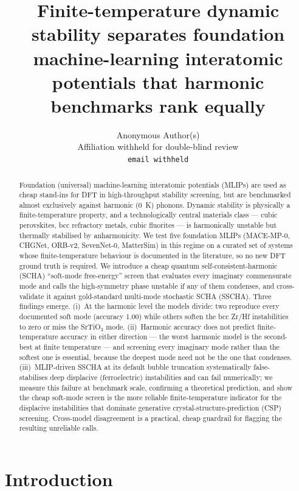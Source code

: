 \documentclass{article}
\title{Finite-temperature dynamic stability separates foundation machine-learning interatomic potentials that harmonic benchmarks rank equally}
\author{%
  Anonymous Author(s) \\
  Affiliation withheld for double-blind review \\
  \texttt{email withheld}
}
\begin{document}
\maketitle

\begin{abstract}
Foundation (universal) machine-learning interatomic potentials (MLIPs) are used as cheap stand-ins for DFT in high-throughput stability screening, but are benchmarked almost exclusively against harmonic (0~K) phonons. Dynamic stability is physically a finite-temperature property, and a technologically central materials class --- cubic perovskites, bcc refractory metals, cubic fluorites --- is harmonically unstable but thermally stabilised by anharmonicity. We test five foundation MLIPs (MACE-MP-0, CHGNet, ORB-v2, SevenNet-0, MatterSim) in this regime on a curated set of systems whose finite-temperature behaviour is documented in the literature, so no new DFT ground truth is required. We introduce a cheap quantum self-consistent-harmonic (SCHA) ``soft-mode free-energy'' screen that evaluates every imaginary commensurate mode and calls the high-symmetry phase unstable if any of them condenses, and cross-validate it against gold-standard multi-mode stochastic SCHA (SSCHA). Three findings emerge. (i)~At the harmonic level the models divide: two reproduce every documented soft mode (accuracy 1.00) while others soften the bcc Zr/Hf instabilities to zero or miss the SrTiO$_3$ mode. (ii)~Harmonic accuracy does not predict finite-temperature accuracy in either direction --- the worst harmonic model is the second-best at finite temperature --- and screening every imaginary mode rather than the softest one is essential, because the deepest mode need not be the one that condenses. (iii)~MLIP-driven SSCHA at its default bubble truncation systematically false-stabilises deep displacive (ferroelectric) instabilities and can fail numerically; we measure this failure at benchmark scale, confirming a theoretical prediction, and show the cheap soft-mode screen is the more reliable finite-temperature indicator for the displacive instabilities that dominate generative crystal-structure-prediction (CSP) screening. Cross-model disagreement is a practical, cheap guardrail for flagging the resulting unreliable calls.
\end{abstract}

\section{Introduction}
\label{sec:intro}
\end{document}
